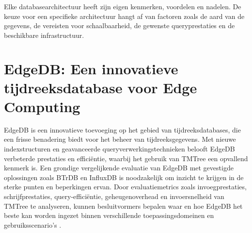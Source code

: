   \begin{table}[h]
    \centering
    \caption{Overzicht van de specificaties van InfluxDB \autocite{InfluxDBDocumentation}}
\end{table}

Elke databasearchitectuur heeft zijn eigen kenmerken, voordelen en nadelen. De keuze voor een specifieke architectuur hangt af van factoren zoals de aard van de gegevens, de vereisten voor schaalbaarheid, de gewenste queryprestaties en de beschikbare infrastructuur.


\section{EdgeDB: Een innovatieve tijdreeksdatabase voor Edge Computing}

EdgeDB is een innovatieve toevoeging op het gebied van tijdreeksdatabases, die een frisse benadering biedt voor het beheer van tijdreeksgegevens. Met nieuwe indexstructuren en geavanceerde queryverwerkingstechnieken belooft EdgeDB verbeterde prestaties en efficiëntie, waarbij het gebruik van TMTree een opvallend kenmerk is. Een grondige vergelijkende evaluatie van EdgeDB met gevestigde oplossingen zoals BTrDB en InfluxDB is noodzakelijk om inzicht te krijgen in de sterke punten en beperkingen ervan. Door evaluatiemetrics zoals invoegprestaties, schrijfprestaties, query-efficiëntie, geheugenoverhead en invoersnelheid van TMTree te analyseren, kunnen besluitvormers bepalen waar en hoe EdgeDB het beste kan worden ingezet binnen verschillende toepassingsdomeinen en gebruiksscenario's \autocite{Yang2019EdgeDBAE}.


